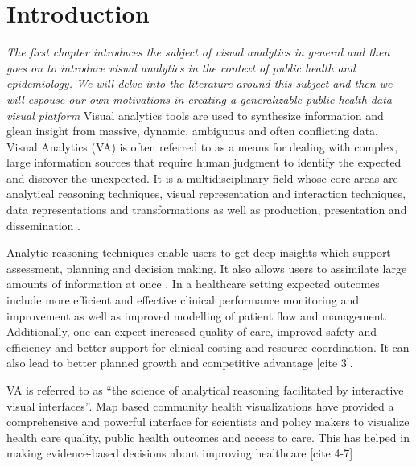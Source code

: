 \chapter{Introduction}
\label{chap:Intro}
\textit{The first chapter introduces the subject of visual analytics in general and then goes on to introduce visual analytics in the context of public health and epidemiology. We will delve into the literature around this subject and then we will espouse our own motivations in creating a generalizable public health data visual platform}
\vfill
\minitoc
\newpage
\renewcommand{\baselinestretch}{1.80}\normalsize
Visual analytics tools are used to synthesize information and glean insight from massive, dynamic, ambiguous and often conflicting data. Visual Analytics (VA) is often referred to as a means for dealing with complex, large information sources that require human judgment to identify the expected and discover the unexpected. It is a multidisciplinary field whose core areas are analytical reasoning techniques, visual representation and interaction techniques, data representations and transformations as well as production, presentation and dissemination \cite{thomas2006visual}. 

Analytic reasoning techniques enable users to get deep insights which 	support assessment, planning and decision making. It also allows users to assimilate large amounts of information at once \cite{cook2005illuminating}. In a healthcare setting expected outcomes include more efficient and effective clinical performance monitoring and improvement as well as improved modelling of patient flow and management. Additionally, one can expect increased quality of care, improved safety and efficiency and better support for clinical costing and resource coordination. It can also lead to better planned growth and competitive advantage [cite 3].


VA is referred to as “the science of analytical reasoning facilitated by interactive visual interfaces”. Map based community health visualizations have provided a comprehensive and powerful interface for scientists and policy makers to visualize health care quality, public health outcomes and access to care. This has helped in making evidence-based decisions about improving healthcare [cite 4-7]
 
